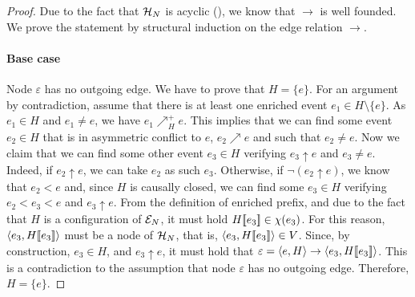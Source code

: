 \begin{proof}
Due to the fact that $\mathcal{H}_{N}$ is acyclic (), we know that $\to$
is well founded.  We prove the statement by structural induction on the edge
relation $\to$.

\paragraph{Base case} Node $\varepsilon$ has no outgoing edge.  We have to
prove that $H = \{e\}$.  For an argument by contradiction, assume that there is
at least one enriched event $e_1 \in H \setminus \{e\}$.  As $e_1 \in H$ and
$e_1 \ne e$, we have $e_1 \nearrow^+_H e$.  This implies that we can find some
event $e_2 \in H$ that is in asymmetric conflict to $e$, $e_2 \nearrow e$ and
such that $e_2 \ne e$.  Now we claim that we can find some other event $e_3 \in
H$ verifying $e_3 \uparrow e$ and $e_3 \ne e$.  Indeed, if $e_2 \uparrow e$, we
can take $e_2$ as such $e_3$.  Otherwise, if $\lnot (e_2 \uparrow e)$, we know
that $e_2 < e$ and, since $H$ is causally closed, we can find some $e_3 \in H$
verifying $e_2 < e_3 < e$ and $e_3 \uparrow e$.  From the definition of
enriched prefix, and due to the fact that $H$ is a configuration of $\mathcal{E}_{N}$,
it must hold $H [\![ e_3]\!] \in \chi (e_3)$.  For this reason, $\langle e_3, H
[\![ e_3]\!] \rangle$ must be a node of $\mathcal{H}_{N}$, that is, $\langle e_3, H
[\![ e_3]\!] \rangle \in V$.  Since, by construction, $e_3 \in H$, and $e_3
\uparrow e$, it must hold that $\varepsilon = \langle e, H \rangle \to \langle
e_3, H [\![ e_3]\!] \rangle$.  This is a contradiction to the assumption that node
$\varepsilon$ has no outgoing edge.  Therefore, $H = \{e\}$.


\end{proof}
